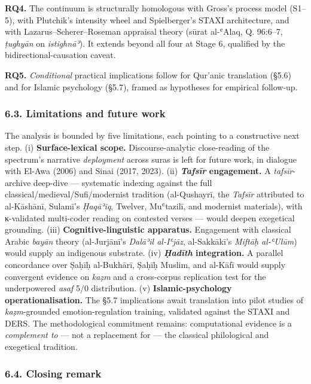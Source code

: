 \textbf{RQ4.} The continuum is structurally homologous with Gross's
process model (S1--5), with Plutchik's intensity wheel and Spielberger's
STAXI architecture, and with Lazarus--Scherer--Roseman appraisal theory
(sūrat al-ʿAlaq, Q. 96:6--7, \emph{ṭughyān} on \emph{istighnāʾ}). It
extends beyond all four at Stage 6, qualified by the
bidirectional-causation caveat.

\textbf{RQ5.} \emph{Conditional} practical implications follow for
Qur'anic translation (§5.6) and for Islamic psychology (§5.7), framed as
hypotheses for empirical follow-up.

\subsubsection{6.3. Limitations and future
work}\label{limitations-and-future-work}

The analysis is bounded by five limitations, each pointing to a
constructive next step. (i) \textbf{Surface-lexical scope.}
Discourse-analytic close-reading of the spectrum's narrative
\emph{deployment} across suras is left for future work, in dialogue with
El-Awa (2006) and Sinai (2017, 2023). (ii) \textbf{\emph{Tafsīr}
engagement.} A \emph{tafsīr}-archive deep-dive --- systematic indexing
against the full classical/medieval/Sufi/modernist tradition
(al-Qushayrī, the \emph{Tafsīr} attributed to al-Kāshānī, Sulamī's
\emph{Ḥaqāʾiq}, Twelver, Muʿtazilī, and modernist materials), with
κ-validated multi-coder reading on contested verses --- would deepen
exegetical grounding. (iii) \textbf{Cognitive-linguistic apparatus.}
Engagement with classical Arabic \emph{bayān} theory (al-Jurjānī's
\emph{Dalāʾil al-Iʿjāz}, al-Sakkākī's \emph{Miftāḥ al-ʿUlūm}) would
supply an indigenous substrate. (iv) \textbf{\emph{Ḥadīth} integration.}
A parallel concordance over Ṣaḥīḥ al-Bukhārī, Ṣaḥīḥ Muslim, and al-Kāfī
would supply convergent evidence on \emph{kaẓm} and a cross-corpus
replication test for the underpowered \emph{asaf} 5/0 distribution. (v)
\textbf{Islamic-psychology operationalisation.} The §5.7 implications
await translation into pilot studies of \emph{kaẓm}-grounded
emotion-regulation training, validated against the STAXI and DERS. The
methodological commitment remains: computational evidence is a
\emph{complement to} --- not a replacement for --- the classical
philological and exegetical tradition.

\subsubsection{6.4. Closing remark}\label{closing-remark}

